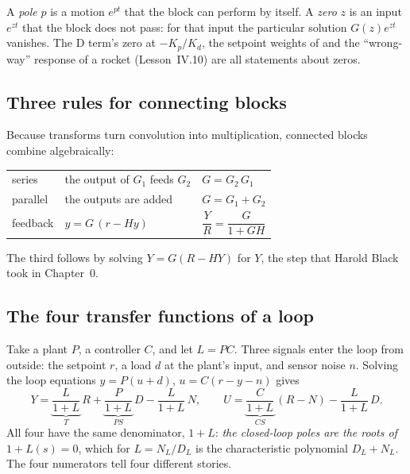 A \emph{pole} $p$ is a motion $e^{pt}$ that the block can perform by itself. A \emph{zero} $z$ is an input $e^{zt}$ that the block does not pass: for that input the particular solution $G(z)e^{zt}$ vanishes. The D term's zero at $-K_p/K_d$, the setpoint weights of  and the \enquote{wrong-way} response of a rocket (Lesson~IV.10) are all statements about zeros.

\subsection{Three rules for connecting blocks}
Because transforms turn convolution into multiplication, connected blocks combine algebraically:
\begin{center}
\renewcommand{\arraystretch}{1.5}
\begin{tabular}{@{}lll@{}}
series & the output of $G_1$ feeds $G_2$ & $G = G_2\,G_1$\\
parallel & the outputs are added & $G = G_1 + G_2$\\
feedback & $y = G\,(r - Hy)$ & $\dfrac{Y}{R} = \dfrac{G}{1 + GH}$\\
\end{tabular}
\end{center}
The third follows by solving $Y = G(R - HY)$ for $Y$, the step that Harold Black took in Chapter~0.

\subsection{The four transfer functions of a loop}
Take a plant $P$, a controller $C$, and let $L = PC$. Three signals enter the loop from outside: the setpoint $r$, a load $d$ at the plant's input, and sensor noise $n$. Solving the loop equations $y = P(u + d)$, $u = C(r - y - n)$ gives
\begin{equation}\label{eq:C-gang}
  Y = \underbrace{\frac{L}{1 + L}}_{T}\,R + \underbrace{\frac{P}{1 + L}}_{PS}\,D - \frac{L}{1 + L}\,N, \qquad
  U = \underbrace{\frac{C}{1 + L}}_{CS}\,(R - N) - \frac{L}{1 + L}\,D .
\end{equation}
All four have the same denominator, $1 + L$: \emph{the closed-loop poles are the roots of $1 + L(s) = 0$}, which for $L = N_L/D_L$ is the characteristic polynomial $D_L + N_L$. The four numerators tell four different stories.

